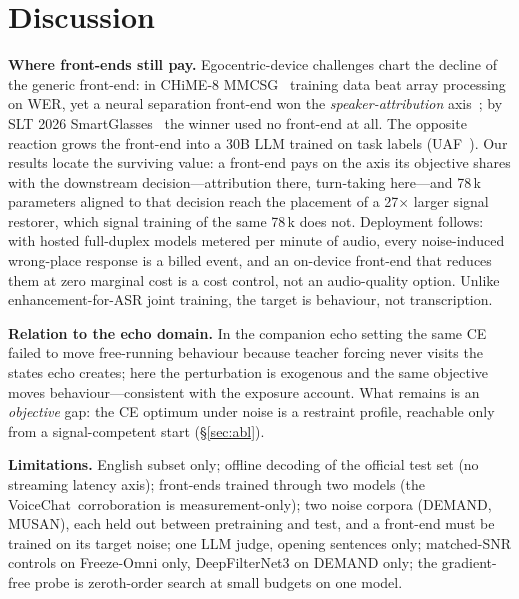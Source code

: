 \documentclass{article}
\newcommand{\vc}{VoiceChat}
\begin{document}
\section{Discussion}
\label{sec:discussion}
\textbf{Where front-ends still pay.} Egocentric-device challenges chart the decline of the generic front-end: in CHiME-8 MMCSG~\cite{zmolikova2024mmcsg} training data beat array processing on WER, yet a neural separation front-end won the \emph{speaker-attribution} axis~\cite{pang2024seuee}; by SLT 2026 SmartGlasses~\cite{smartglasses2026} the winner used no front-end at all. The opposite reaction grows the front-end into a 30B LLM trained on task labels (UAF~\cite{uaf2026}). Our results locate the surviving value: a front-end pays on the axis its objective shares with the downstream decision---attribution there, turn-taking here---and 78\,k parameters aligned to that decision reach the placement of a 27$\times$ larger signal restorer, which signal training of the same 78\,k does not. Deployment follows: with
hosted full-duplex models metered per minute of audio, every
noise-induced wrong-place response is a billed event, and an on-device front-end that reduces
them at zero marginal cost is a cost control, not an audio-quality option. Unlike enhancement-for-ASR joint training, the target is behaviour, not transcription.

\textbf{Relation to the echo domain.} In the companion echo setting the same CE failed to move free-running behaviour because teacher forcing never visits the states echo creates; here the perturbation is exogenous and the same objective moves behaviour---consistent with the exposure account. What remains is an \emph{objective} gap: the CE optimum under noise is a restraint profile, reachable only from a signal-competent start (\S\ref{sec:abl}).

\textbf{Limitations.} English subset only; offline decoding of the official test set (no
streaming latency axis); front-ends trained through two models (the \vc\ corroboration is
measurement-only); two noise corpora (DEMAND, MUSAN), each held out between pretraining and test, and a front-end must be trained on its target noise; one LLM judge, opening sentences only; matched-SNR controls on Freeze-Omni only, DeepFilterNet3 on DEMAND only; the gradient-free probe is zeroth-order search at small budgets on one model.
\end{document}
